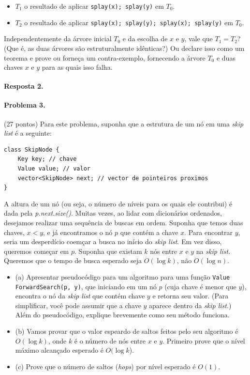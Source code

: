 \documentclass{article}
\begin{document}
\begin{itemize}
    \item $T_1$ o resultado de aplicar \texttt{splay(x); splay(y)} em $T_0$.
    \item $T_2$ o resultado de aplicar \texttt{splay(x); splay(y); splay(x); splay(y)} em $T_0$.
\end{itemize}

Independentemente da árvore inicial $T_0$ e da escolha de $x$ e $y$, vale que $T_1 = T_2$? (Que
é, as duas árvores são estruturalmente idênticas?) Ou declare isso como um teorema e prove ou
forneça um contra-exemplo, fornecendo a árvore $T_0$ e duas chaves $x$ e $y$ para as quais isso falha.

\paragraph{Resposta 2.}

\paragraph{Problema 3.} (27 pontos) 
Para este problema, suponha que a estrutura de um nó em
uma \textit{skip list} é a seguinte:

\begin{lstlisting}
class SkipNode {
    Key key; // chave
    Value value; // valor
    vector<SkipNode> next; // vector de pointeiros proximos
}
\end{lstlisting}

A altura de um nó (ou seja, o número de níveis para os quais ele contribui) é dada pela \textit{p.next.size()}.
Muitas vezes, ao lidar com dicionários ordenados, desejamos realizar uma sequência de buscas em ordem. Suponha que temos duas chaves, $x < y$, e já encontramos o nó $p$ que contém a chave $x$. Para encontrar $y$, seria um desperdício coemçar a busca no início do \textit{skip list}. Em vez disso, queremos começar em $p$. Suponha que existam $k$ nós entre
$x$ e $y$ na \textit{skip list}. Queremos que o tempo de busca esperado seja $O(\log k)$, não $O(\log n)$.

\begin{itemize}
    \item (a) Apresentar pseudocódigo para um algoritmo para uma função \texttt{Value ForwardSearch(p, y)}, que iniciando em um nó $p$ (cuja chave é menor que $y$), encontra o nó da \textit{skip list} que contém chave $y$ e retorna seu valor. (Para simplificar, você pode assumir que a chave $y$ aparece dentro da \textit{skip list}.) Além do pseudocódigo, explique brevemente como seu método funciona.
    \item (b) Vamos provar que o valor espeardo de saltos feitos pelo seu algoritmo é $O(\log k)$, onde $k$ é o
número de nós entre $x$ e $y$. Primeiro prove que o nível máximo alcançado esperado é $O(\log k$).
    \item (c) Prove que o número de saltos (\textit{hops}) por nível esperado é $O(1)$.
\end{itemize}
\end{document}
